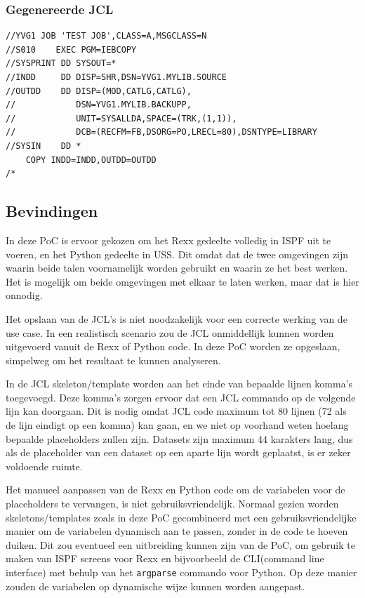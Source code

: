 \subsubsection{Gegenereerde JCL}

\begin{verbatim}
//YVG1 JOB 'TEST JOB',CLASS=A,MSGCLASS=N
//S010    EXEC PGM=IEBCOPY
//SYSPRINT DD SYSOUT=*
//INDD     DD DISP=SHR,DSN=YVG1.MYLIB.SOURCE
//OUTDD    DD DISP=(MOD,CATLG,CATLG),
//            DSN=YVG1.MYLIB.BACKUPP,
//            UNIT=SYSALLDA,SPACE=(TRK,(1,1)),
//            DCB=(RECFM=FB,DSORG=PO,LRECL=80),DSNTYPE=LIBRARY
//SYSIN    DD *
    COPY INDD=INDD,OUTDD=OUTDD
/*
\end{verbatim}

\subsection{Bevindingen}
In deze PoC is ervoor gekozen om het Rexx gedeelte volledig in ISPF uit te voeren, en het Python gedeelte in USS. Dit omdat dat de twee omgevingen zijn waarin beide talen voornamelijk worden gebruikt en waarin ze het best werken. Het is mogelijk om beide omgevingen met elkaar te laten werken, maar dat is hier onnodig.

Het opslaan van de JCL's is niet noodzakelijk voor een correcte werking van de use case. In een realistisch scenario zou de JCL onmiddellijk kunnen worden uitgevoerd vanuit de Rexx of Python code. In deze PoC worden ze opgeslaan, simpelweg om het resultaat te kunnen analyseren.

In de JCL skeleton/template worden aan het einde van bepaalde lijnen komma's toegevoegd. Deze komma's zorgen ervoor dat een JCL commando op de volgende lijn kan doorgaan. Dit is nodig omdat JCL code maximum tot 80 lijnen (72 als de lijn eindigt op een komma) kan gaan, en we niet op voorhand weten hoelang bepaalde placeholders zullen zijn. Datasets zijn maximum 44 karakters lang, dus als de placeholder van een dataset op een aparte lijn wordt geplaatst, is er zeker voldoende ruimte.

Het manueel aanpassen van de Rexx en Python code om de variabelen voor de placeholders te vervangen, is niet gebruiksvriendelijk. Normaal gezien worden skeletons/templates zoals in deze PoC gecombineerd met een gebruiksvriendelijke manier om de variabelen dynamisch aan te passen, zonder in de code te hoeven duiken. Dit zou eventueel een uitbreiding kunnen zijn van de PoC, om gebruik te maken van ISPF screens voor Rexx en bijvoorbeeld de CLI(command line interface) met behulp van het \texttt{argparse} commando voor Python. Op deze manier zouden de variabelen op dynamische wijze kunnen worden aangepast.

